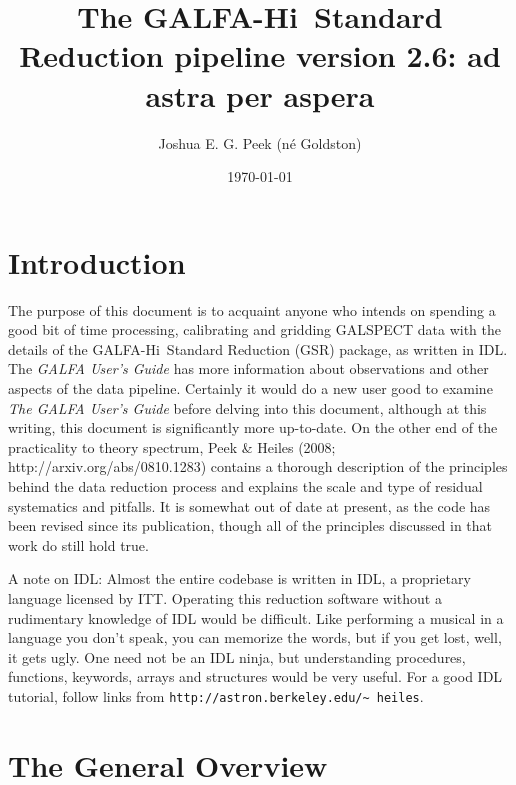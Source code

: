 \documentclass[11pt]{article}
\newcommand{\hi}{H{\sc i}~}
\begin{document}
\title{The GALFA-\hi Standard Reduction pipeline version 2.6: ad astra per aspera}
\author{Joshua E. G. Peek (n\'e Goldston)}
\date{\today}
\maketitle

\section{Introduction}

The purpose of this document is to acquaint anyone who intends on spending a good bit of time processing, calibrating and gridding GALSPECT data with the details of the GALFA-\hi Standard Reduction (GSR) package, as written in IDL. The {\it GALFA User's Guide} has more information about observations and other aspects of the data pipeline. Certainly it would do a new user good to examine {\it The GALFA User's Guide} before delving into this document, although at this writing, this document is significantly more up-to-date. On the other end of the practicality to theory spectrum, Peek \& Heiles (2008; http://arxiv.org/abs/0810.1283) contains a thorough description of the principles behind the data reduction process and explains the scale and type of residual systematics and pitfalls. It is somewhat out of date at present, as the code has been revised since its publication, though all of the principles discussed in that work do still hold true.

A note on IDL: Almost the entire codebase is written in IDL, a proprietary language licensed by ITT. Operating this reduction software without a rudimentary knowledge of IDL would be difficult. Like performing a musical in a language you don't speak,  you can memorize the words, but if you get lost, well, it gets ugly. One need not be an IDL ninja, but understanding procedures, functions, keywords, arrays and structures would be very useful. For a good IDL tutorial, follow links from \texttt{http://astron.berkeley.edu/\~~heiles}. 

\section{The General Overview}
\end{document}
